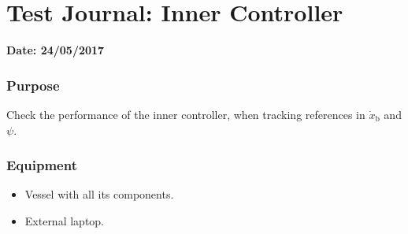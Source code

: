 \chapter{Test Journal: Inner Controller} \label{app:Inner}

\textbf{Date: 24/05/2017}

\subsection*{Purpose}
Check the performance of the inner controller, when tracking references in $\dot{x}_\mathrm{b}$ and $\psi$.

\subsection*{Equipment}
\begin{itemize}
    \item Vessel with all its components. 
    \item External laptop.
\end{itemize}

